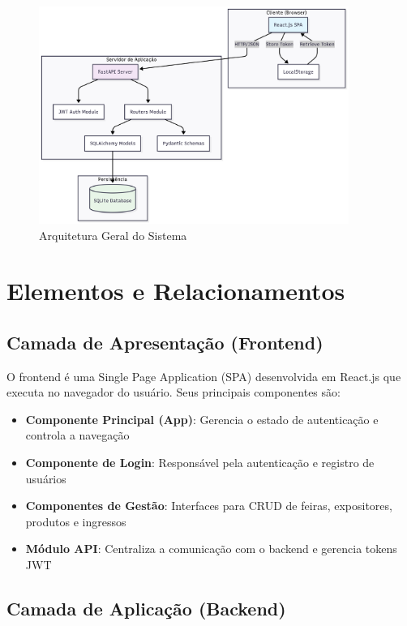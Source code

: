 \documentclass[12pt,a4paper]{article}
\begin{document}
\begin{figure}[h]
    \centering
    \includegraphics[width=0.9\textwidth]{diagrams/arquitetura_alto_nivel.png}
    \caption{Arquitetura Geral do Sistema}
    \label{fig:arquitetura_alto_nivel}
\end{figure}

\section{Elementos e Relacionamentos}

\subsection{Camada de Apresentação (Frontend)}

O frontend é uma Single Page Application (SPA) desenvolvida em React.js que executa no navegador do usuário. Seus principais componentes são:

\begin{itemize}
    \item \textbf{Componente Principal (App)}: Gerencia o estado de autenticação e controla a navegação
    \item \textbf{Componente de Login}: Responsável pela autenticação e registro de usuários
    \item \textbf{Componentes de Gestão}: Interfaces para CRUD de feiras, expositores, produtos e ingressos
    \item \textbf{Módulo API}: Centraliza a comunicação com o backend e gerencia tokens JWT
\end{itemize}

\subsection{Camada de Aplicação (Backend)}
\end{document}
